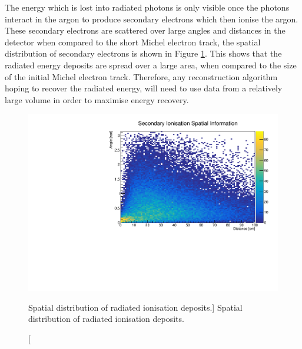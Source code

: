 The energy which is lost into radiated photons is only visible once the photons
interact in the argon to produce secondary electrons which then ionise the
argon. These secondary electrons are scattered over large angles and distances
in the detector when compared to the short Michel electron track, the spatial 
distribution of secondary electrons is shown in Figure \ref{fig:photon_geom}.
This shows that the radiated energy deposits are spread over a large area, when
compared to the size of the initial Michel electron track. Therefore, any 
reconstruction algorithm hoping to recover the radiated energy, will 
need to use data from a relatively large volume in order to maximise energy
recovery.
\begin{figure}
	\centering
	\includegraphics[width=\textwidth]{figures/photon_geom.pdf}
	\caption
	[Spatial distribution of radiated ionisation deposits.]
	{Spatial distribution of radiated ionisation deposits.}
	\label{fig:photon_geom}
\end{figure}

